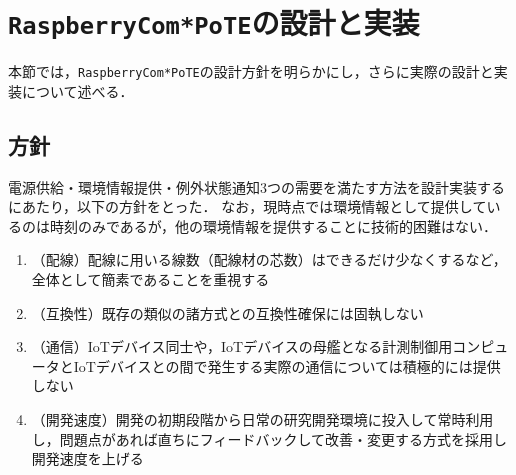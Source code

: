 

\section{{\tt Raspberry\-Com*PoTE}の設計と実装}
\label{sec:04design_and_implementation}

本節では，{\tt Raspberry\-Com*PoTE}の設計方針を明らかにし，さらに実際の設計と実装について述べる．


\subsection{方針}

電源供給・環境情報提供・例外状態通知3つの需要を満たす方法を設計実装するにあたり，以下の方針をとった．
なお，現時点では環境情報として提供しているのは時刻のみであるが，他の環境情報を提供することに技術的困難はない．

\begin{enumerate}
\item （配線）配線に用いる線数（配線材の芯数）はできるだけ少なくするなど，全体として簡素であることを重視する
\item （互換性）既存の類似の諸方式との互換性確保には固執しない
\item （通信）IoTデバイス同士や，IoTデバイスの母艦となる計測制御用コンピュータとIoTデバイスとの間で発生する実際の通信については積極的には提供しない
\item （開発速度）開発の初期段階から日常の研究開発環境に投入して常時利用し，問題点があれば直ちにフィードバックして改善・変更する方式を採用し開発速度を上げる
\end{enumerate}

